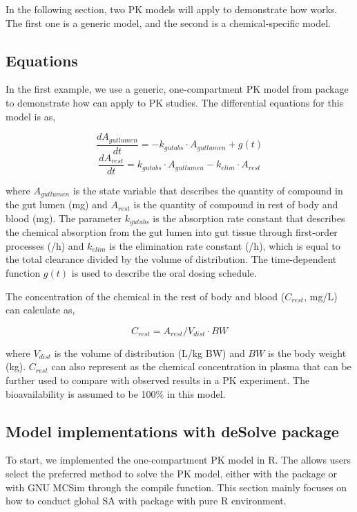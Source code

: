 In the following section, two PK models will apply to demonstrate how
 works. The first one is a generic model, and the
second is a chemical-specific model.

\hypertarget{equations}{%
\subsection{Equations}\label{equations}}

In the first example, we use a generic, one-compartment PK model from
 package \citep{JSSv079i04} to demonstrate how
 can apply to PK studies. The differential equations
for this model is as,

\[\frac{dA_{gutlumen}}{dt} = -k_{gutabs} \cdot A_{gutlumen} + g(t)\]
\[\frac{dA_{rest}}{dt} = k_{gutabs} \cdot A_{gutlumen}-k_{elim} \cdot A_{rest}\]

where \(A_{gutlumen}\) is the state variable that describes the quantity
of compound in the gut lumen (mg) and \(A_{rest}\) is the quantity of
compound in rest of body and blood (mg). The parameter \(k_{gutabs}\) is
the absorption rate constant that describes the chemical absorption from
the gut lumen into gut tissue through first-order processes (/h) and
\(k_{elim}\) is the elimination rate constant (/h), which is equal to
the total clearance divided by the volume of distribution. The
time-dependent function \(g(t)\) is used to describe the oral dosing
schedule.

The concentration of the chemical in the rest of body and blood
(\(C_{rest}\), mg/L) can calculate as,

\[ C_{rest} = A_{rest} / V_{dist} \cdot BW\]

where \(V_{dist}\) is the volume of distribution (L/kg BW) and \(BW\) is
the body weight (kg). \(C_{rest}\) can also represent as the chemical
concentration in plasma that can be further used to compare with
observed results in a PK experiment. The bioavailability is assumed to
be 100\% in this model.

\hypertarget{model-implementations-with-desolve-package}{%
\subsection{\texorpdfstring{Model implementations with \textbf{deSolve}
package}{Model implementations with deSolve package}}\label{model-implementations-with-desolve-package}}

To start, we implemented the one-compartment PK model in R. The
 allows users select the preferred method to solve the
PK model, either with the  package or with GNU MCSim
through the compile function. This section mainly focuses on how to
conduct global SA with  package with pure R
environment.

